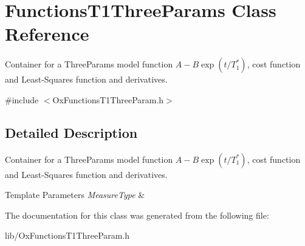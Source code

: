 \hypertarget{class_functions_t1_three_params}{\section{Functions\-T1\-Three\-Params Class Reference}
\label{class_functions_t1_three_params}
}


Container for a Three\-Params model function $ A-B\exp(t/T_1^*) $, cost function and Least-\/\-Squares function and derivatives.  




{\ttfamily \#include $<$Ox\-Functions\-T1\-Three\-Param.\-h$>$}



\subsection{Detailed Description}
Container for a Three\-Params model function $ A-B\exp(t/T_1^*) $, cost function and Least-\/\-Squares function and derivatives. 


\begin{DoxyTemplParams}{Template Parameters}
{\em Measure\-Type} & \\
\hline
\end{DoxyTemplParams}


The documentation for this class was generated from the following file\-:\begin{DoxyCompactItemize}
\item 
lib/Ox\-Functions\-T1\-Three\-Param.\-h\end{DoxyCompactItemize}
